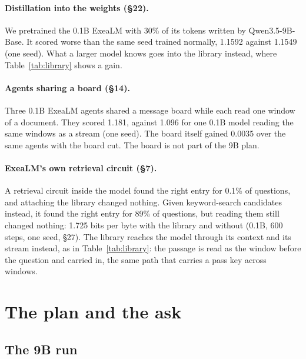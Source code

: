 \documentclass[11pt,letterpaper]{article}
\newcommand{\sect}[1]{\S#1}
\begin{document}
\paragraph{Distillation into the weights (\sect{22}).}
We pretrained the 0.1B ExeaLM with 30\% of its tokens written by Qwen3.5-9B-Base.
It scored worse than the same seed trained normally, 1.1592 against 1.1549 (one seed).
What a larger model knows goes into the library instead, where Table~\ref{tab:library} shows a gain.

\paragraph{Agents sharing a board (\sect{14}).}
Three 0.1B ExeaLM agents shared a message board while each read one window of a document.
They scored 1.181, against 1.096 for one 0.1B model reading the same windows as a stream (one seed).
The board itself gained 0.0035 over the same agents with the board cut.
The board is not part of the 9B plan.

\paragraph{ExeaLM's own retrieval circuit (\sect{7}).}
A retrieval circuit inside the model found the right entry for 0.1\% of questions, and attaching the library changed nothing.
Given keyword-search candidates instead, it found the right entry for 89\% of questions, but reading them still changed nothing: 1.725 bits per byte with the library and without (0.1B, 600 steps, one seed, \sect{27}).
The library reaches the model through its context and its stream instead, as in Table~\ref{tab:library}: the passage is read as the window before the question and carried in, the same path that carries a pass key across windows.

\section{The plan and the ask}

\subsection{The 9B run}
\end{document}
